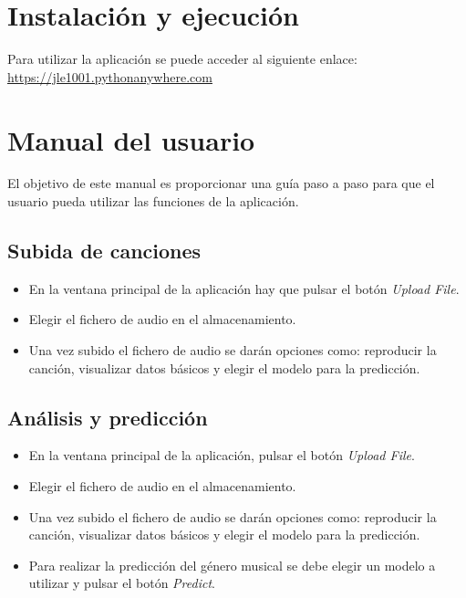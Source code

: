 \section{Instalación y ejecución}

Para utilizar la aplicación se puede acceder al siguiente enlace: \url{https://jle1001.pythonanywhere.com}

\section{Manual del usuario}
El objetivo de este manual es proporcionar una guía paso a paso para que el usuario pueda utilizar las funciones de la aplicación.

\subsection{Subida de canciones}
\begin{itemize}
\tightlist

\item En la ventana principal de la aplicación hay que pulsar el botón \textit{Upload File}.
\item Elegir el fichero de audio en el almacenamiento.
\item Una vez subido el fichero de audio se darán opciones como: reproducir la canción, visualizar datos básicos y elegir el modelo para la predicción.

\end{itemize}


\subsection{Análisis y predicción}

\begin{itemize}
\tightlist

\item En la ventana principal de la aplicación, pulsar el botón \textit{Upload File}.
\item Elegir el fichero de audio en el almacenamiento.
\item Una vez subido el fichero de audio se darán opciones como: reproducir la canción, visualizar datos básicos y elegir el modelo para la predicción.
\item Para realizar la predicción del género musical se debe elegir un modelo a utilizar y pulsar el botón \textit{Predict}.

\end{itemize}

